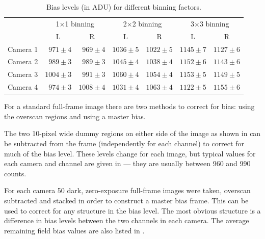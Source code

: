 \begin{colsection}
\begin{colsection}
\begin{table}[t]
    \begin{center}
        \begin{tabular}{c|rr|rr|rr} %
            &
            \multicolumn{2}{c|}{1$\times$1 binning} &
            \multicolumn{2}{c|}{2$\times$2 binning} &
            \multicolumn{2}{c}{3$\times$3 binning}
            \\
             &
            \multicolumn{1}{c}{L} &
            \multicolumn{1}{c|}{R} &
            \multicolumn{1}{c}{L} &
            \multicolumn{1}{c|}{R} &
            \multicolumn{1}{c}{L} &
            \multicolumn{1}{c}{R}
            \\
            \midrule
            Camera 1 &  $971\pm4$ &  $969\pm4$ & $1036\pm5$ & $1022\pm5$ & $1145\pm7$ & $1127\pm6$\\
            Camera 2 &  $989\pm3$ &  $989\pm3$ & $1045\pm4$ & $1038\pm4$ & $1152\pm6$ & $1143\pm6$\\
            Camera 3 & $1004\pm3$ &  $991\pm3$ & $1060\pm4$ & $1054\pm4$ & $1153\pm5$ & $1149\pm5$\\
            Camera 4 &  $974\pm3$ & $1008\pm4$ & $1031\pm4$ & $1063\pm4$ & $1122\pm5$ & $1155\pm6$\\
        \end{tabular}
    \end{center}
    \caption[TODO]{
        Bias levels (in ADU) for different binning factors.
        }\label{tab:bias_bins}
\end{table}


For a standard full-frame image there are two methods to correct for bias: using the overscan regions and using a master bias.

The two 10-pixel wide dummy regions on either side of the image as shown in  can be subtracted from the frame (independently for each channel) to correct for much of the bias level. These levels change for each image, but typical values for each camera and channel are given in  --- they are usually between 960 and 990 counts.

For each camera 50 dark, zero-exposure full-frame images were taken, overscan subtracted and stacked in order to construct a master bias frame. This can be used to correct for any structure in the bias level. The most obvious structure is a difference in bias levels between the two channels in each camera. The average remaining field bias values are also listed in .


\end{colsection}
\end{colsection}
